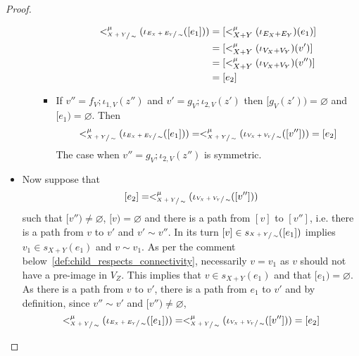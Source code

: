 \begin{proof}
\begin{itemize}
\begin{itemize}
\begin{itemize}
                            \begin{align*}
                                    <_{\sfrac{X+Y}{\sim}}^{\mu}(\iota_{\sfrac{E_{X} + E_{Y}}{\sim}}([e_1])) &= [<_{X+Y}^{\mu}(\iota_{E_{X} + E_{Y}})(e_1)]\\
                                                                                                    &= [<_{X+Y}^{\mu}(\iota_{V_{X} + V_{Y}})(v')]\\
                                                                                                    &= [<_{X+Y}^{\mu}(\iota_{V_{X} + V_{Y}})(v'')]\\
                                                                                                    &= [e_2]
                                  \end{align*}
                        \item If $v'' = f_{V};\iota_{1,V}(z'')$ and $v' = g_{V};\iota_{2,V}(z')$ then $[g_{V}(z')) = \varnothing$ and $[e_1) = \varnothing$. 
                        Then
                        \begin{align*}
                            <_{\sfrac{X+Y}{\sim}}^{\mu}(\iota_{\sfrac{E_{X} + E_{Y}}{\sim}}([e_1])) = <_{\sfrac{X+Y}{\sim}}^{\mu}(\iota_{\sfrac{V_{X} + V_{Y}}{\sim}}([v''])) = [e_2]
                        \end{align*}
                        The case when $v'' = g_{V};\iota_{2,V}(z'')$ is symmetric.
                    \end{itemize}
                \end{itemize}
                \item Now suppose that 
                \[
                [e_2] = <_{\sfrac{X+Y}{\sim}}^{\mu}(\iota_{\sfrac{V_{X} + V_{Y}}{\sim}}([v'']))
                \]
                such that $[v'') \not = \varnothing$, $[v) = \varnothing$ and there is a path from $[v]$ to $[v'']$, i.e. there is a path from $v$ to $v'$ and $v' \sim v''$.
                In its turn $[v] \in s_{\sfrac{X + Y}{\sim}}([e_1])$ implies $v_1 \in s_{X+Y}(e_1)$ and $v \sim v_1$.
                As per the comment below~\ref{def:child_respects_connectivity}, necessarily $v = v_1$ as $v$ should not have a pre-image in $V_{Z}$.
                This implies that $v \in s_{X+Y}(e_1)$ and that $[e_1) = \varnothing$.
                As there is a path from $v$ to $v'$, there is a path from $e_1$ to $v'$ and by definition, since $v'' \sim v'$ and $[v'') \not = \varnothing$,
                \[
                <_{\sfrac{X+Y}{\sim}}^{\mu}(\iota_{\sfrac{E_{X} + E_{Y}}{\sim}}([e_1])) = <_{\sfrac{X+Y}{\sim}}^{\mu}(\iota_{\sfrac{V_{X} + V_{Y}}{\sim}}([v''])) = [e_2]
                \]
            \end{itemize}    
\end{proof}


